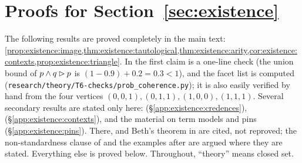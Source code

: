 \providecommand{\BV}{\mathrm{BV}}
\providecommand{\RobQ}{\mathsf{Q}}
\providecommand{\Pt}{\mathrm{Pt}}
\providecommand{\Fix}{\mathrm{Fix}}
\providecommand{\Sent}{\mathrm{Sent}}
\providecommand{\Der}{\mathrm{Der}}
\providecommand{\MC}{\mathrm{MC}}
\providecommand{\LMS}{\mathrm{LMS}}
\providecommand{\conv}{\mathrm{conv}}
\providecommand{\Prf}{\mathrm{Prf}}
\providecommand{\nml}[1]{\underline{#1}}
\providecommand{\twoM}{\mathbf{2}}
\providecommand{\HthreeA}{\mathbf{H}_3}

\section{Proofs for Section~\ref{sec:existence}}\label{app:existence}

The following results are proved completely in the main text:
\cref{prop:existence:image,thm:existence:tautological,thm:existence:arity,cor:existence:contexts,prop:existence:triangle}.
In  the first claim is a one-line check (the union bound of $p\wedge q\rhd p$ is $(1-0.9)+0.2=0.3<1$), and the facet list is computed (\texttt{research/theory/T6-checks/prob\_coherence.py}); it is also easily verified by hand from the four vertices $(0,0,1),(0,1,1),(1,0,0),(1,1,1)$. Several secondary results are stated only here:  (\S\ref{app:existence:credences}),  (\S\ref{app:existence:contexts}), and the material on term models and pins (\S\ref{app:existence:pins}). There,  and Beth's theorem in  are cited, not reproved; the non-standardness clause of  and the examples after  are argued where they are stated. Everything else is proved below. Throughout, ``theory'' means closed set.


